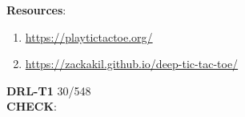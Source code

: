 \noindent \textbf{Resources}:
\begin{enumerate}
    \item \url{https://playtictactoe.org/}

    \item \url{https://zackakil.github.io/deep-tic-tac-toe/}

    
\end{enumerate}




\vspace{0.2cm}
\noindent \textbf{DRL-T1} 30/548 \\
\noindent \textbf{CHECK}: 

